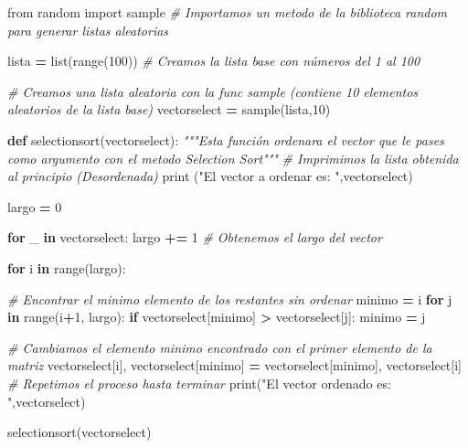 \documentclass[
]{article}
\newenvironment{Shaded}{\begin{snugshade}}{\end{snugshade}}
\newcommand{\BuiltInTok}[1]{#1}
\newcommand{\CommentTok}[1]{\textcolor[rgb]{0.56,0.35,0.01}{\textit{#1}}}
\newcommand{\ControlFlowTok}[1]{\textcolor[rgb]{0.13,0.29,0.53}{\textbf{#1}}}
\newcommand{\DecValTok}[1]{\textcolor[rgb]{0.00,0.00,0.81}{#1}}
\newcommand{\ImportTok}[1]{#1}
\newcommand{\KeywordTok}[1]{\textcolor[rgb]{0.13,0.29,0.53}{\textbf{#1}}}
\newcommand{\NormalTok}[1]{#1}
\newcommand{\OperatorTok}[1]{\textcolor[rgb]{0.81,0.36,0.00}{\textbf{#1}}}
\newcommand{\StringTok}[1]{\textcolor[rgb]{0.31,0.60,0.02}{#1}}
\begin{document}
\begin{Shaded}
\begin{Highlighting}[]

\ImportTok{from}\NormalTok{ random }\ImportTok{import}\NormalTok{ sample }\CommentTok{# Importamos un metodo de la biblioteca random para generar listas aleatorias}

\NormalTok{lista }\OperatorTok{=} \BuiltInTok{list}\NormalTok{(}\BuiltInTok{range}\NormalTok{(}\DecValTok{100}\NormalTok{)) }\CommentTok{# Creamos la lista base con números del 1 al 100}

\CommentTok{# Creamos una lista aleatoria con la func sample (contiene 10 elementos aleatorios de la lista base)}
\NormalTok{vectorselect }\OperatorTok{=}\NormalTok{ sample(lista,}\DecValTok{10}\NormalTok{) }


\KeywordTok{def}\NormalTok{ selectionsort(vectorselect):}
    \CommentTok{"""Esta función ordenara el vector que le pases como argumento con el metodo Selection Sort"""}
    \CommentTok{# Imprimimos la lista obtenida al principio (Desordenada)}
    \BuiltInTok{print}\NormalTok{ (}\StringTok{"El vector a ordenar es: "}\NormalTok{,vectorselect)}
    
\NormalTok{    largo }\OperatorTok{=} \DecValTok{0}
    
    \ControlFlowTok{for}\NormalTok{ _ }\KeywordTok{in}\NormalTok{ vectorselect:}
\NormalTok{        largo }\OperatorTok{+=} \DecValTok{1} \CommentTok{# Obtenemos el largo del vector}
        
    \ControlFlowTok{for}\NormalTok{ i }\KeywordTok{in} \BuiltInTok{range}\NormalTok{(largo): }
      
        \CommentTok{# Encontrar el minimo elemento de los restantes sin ordenar}
\NormalTok{        minimo }\OperatorTok{=}\NormalTok{ i }
        \ControlFlowTok{for}\NormalTok{ j }\KeywordTok{in} \BuiltInTok{range}\NormalTok{(i}\OperatorTok{+}\DecValTok{1}\NormalTok{, largo): }
            \ControlFlowTok{if}\NormalTok{ vectorselect[minimo] }\OperatorTok{>}\NormalTok{ vectorselect[j]: }
\NormalTok{                minimo }\OperatorTok{=}\NormalTok{ j }
                
        \CommentTok{# Cambiamos el elemento minimo encontrado con el primer elemento de la matriz}
\NormalTok{        vectorselect[i], vectorselect[minimo] }\OperatorTok{=}\NormalTok{ vectorselect[minimo], vectorselect[i]}
        \CommentTok{# Repetimos el proceso hasta terminar}
    \BuiltInTok{print}\NormalTok{(}\StringTok{"El vector ordenado es: "}\NormalTok{,vectorselect)}

\NormalTok{selectionsort(vectorselect)}
\end{Highlighting}
\end{Shaded}
\end{document}
